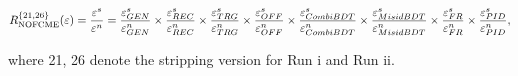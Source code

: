 \hspace*{-1.0cm}\begin{equation}
	R_{\rm{NOFCME}}^{\{21,26\}}(\varepsilon)=\frac{\varepsilon^{s}}{\varepsilon^{n}}=\frac{\varepsilon_{GEN}^{s}}{\varepsilon_{GEN}^{n}} \times \frac{\varepsilon_{REC}^{s}}{\varepsilon_{REC}^{n}} \times \frac{\varepsilon_{TRG}^{s}}{\varepsilon_{TRG}^{n}} \times \frac{\varepsilon_{OFF}^{s}}{\varepsilon_{OFF}^{n}} \times \frac{\varepsilon_{CombiBDT}^{s}}{\varepsilon_{CombiBDT}^{n}} \times \frac{\varepsilon_{MisidBDT}^{s}}{\varepsilon_{MisidBDT}^{n}} \times \frac{\varepsilon_{FR}^{s}}{\varepsilon_{FR}^{n}} \times \frac{\varepsilon_{PID}^{s}}{\varepsilon_{PID}^{n}},
\label{eq:notsplitted}
\end{equation}



 where 21, 26 denote the stripping version for Run \Rn{1} and Run \Rn{2}.

